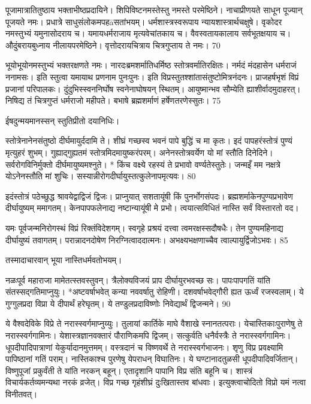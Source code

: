 पूजामात्रातितुष्ठाय भक्ताभीष्ठप्रदायिने।
शिपिविष्टनमस्तेस्तु नमस्ते परमेष्ठिने।
नाचाप्रीणयते साधून पूज्यान् पूजयते नमः।
प्रधात्रे साधुसंलोकमपहāसतांभयम्।
धर्मशास्त्रस्वरूपाय न्यायशास्त्रार्थचक्षुषे।
वृकोदर नमस्तुभ्यं यमुनासोदराय च।
यमायधर्मराजाय मृत्यवेचांतकाय च।
वैवस्वतायकालाय सर्वभूतक्षयाय च।
औदुंबरायबुध्नाय नीलायपरमेष्ठिने।
वृत्तोदरायचित्राय चित्रगुप्ताय ते नमः।
70

भूयोभूयोनमस्तुभ्यं भक्तरक्षणते नमः।
नारदःब्रमशर्मातिधर्मिष्ठ स्तोत्रवर्मातिरक्षितः।
नर्मदं मंदहासेन धर्मराजं ननामसः।
इति स्तुत्वा यमायाथ प्रणनाम पुनःपुनः।
इति विप्रस्तुतश्शांतासंतुष्टोमित्रनंदनः।
प्राजहर्षभृशं विप्रं प्रजानां परिपालकः।
दुंदुभिस्स्वननिर्घोष स्वनेनाघोषयन् स्थितम्।
आयुष्मान्भव सौम्येति ह्याशीर्वादमुदाहरत्।
निषिद्य तं चित्रगुप्तं धर्मराजो महीपते।
बभाषे ब्रह्मशर्माणं हर्षेणतरणेस्सुतः।
75

ईषदुन्मयमानस्सन् स्तुतिप्रीतो दयानिधिः।

स्तोत्रेनानेनसंतुष्ठो दीर्घमायुर्ददामि ते।
शीघ्रं गच्छस्व भवनं पापे बुद्धिं च मा कृतः।
इदं पापहरंस्तोत्रं पुण्यं मृत्युहरं शुभम्।
गुह्याद्गुह्यतमं स्तोत्रमिदमायुष्करंपरम्।
अनेनस्तोत्रवर्येण यो मां स्तौति दिनेदिने।
सर्वरोगविनिर्मुक्तो दीर्घमायुष्यमश्नुते।
* किंच वक्ष्ये रहस्यं ते प्रभावो वर्ण्यतेस्तुतेः।
जन्मइँ मम नक्षत्रे योऽनेनस्तौति मां शुचिः।
सस्यान्नीरोगदीर्घायुस्तत्कुलेनापमृत्यवः।
80

इदंस्तोत्रं पठेच्छुद्ध श्रावयेद्वाद्विजं द्विजः।
प्राप्नुयात् सशतायूंषी किं पुनर्भोगसंपदः।
ब्रह्मशर्माकेनपुण्यप्रभावेण दीर्घायुष्यम् ममागतम्।
केनपापफलेनाद्य नष्टान्यायूंषी मे प्रभो।
त्वयात्सविधितं नास्ति सर्वं विस्तारतो वद।

यमः
पूर्वजन्मनिरोगस्थं विप्रं रिक्तंविदेशगम्।
स्वगृहे प्रश्रयं दत्त्वा त्वमरक्षस्सदौषधैः।
तेन पुण्यमहिनाद्य दीर्घायुष्यं तवागतम्।
परान्नादनदोषेण निरग्नित्वाददात्मनः।
अभक्ष्यभक्षणाच्चैव त्वाल्पायुर्द्विजोऽभवः।
85

तस्मादाचारवान् भूया नास्तिधर्मवतोभयम्।

नळःपूर्व महाराजा मामेतत्स्तवस्तुवन्।
त्रैलोक्यविजयं प्राप दीर्घायुरभवच्छ सः।
पापःपापगतिं यांति संतस्सद्गतिमाप्नुयुः।
*अष्टवर्षाभवेत् कन्या नववर्षातु रोहिणी।
दशवर्षाभवेद्गौरी ह्यत ऊर्ध्वं रजस्वलाम्।
ये गुग्गुलप्रदा विप्रा ये दीपार्थं हरेघृतम्।
ये तण्डुलप्रदाविष्णोः निवेद्यार्थं द्विजन्मने।
90

ये वैश्वदेविके विप्रे ते नरास्स्वर्गमाप्नुय्युः।
तुलायां कार्तिके माघे वैशाखे स्नानतत्पराः।
येचास्तिकाःपुराणेषु ते नरास्स्वर्गगामिनः।
येशास्त्रज्ञानवक्तारं पौराणिकमपि द्विजम्।
सत्कुर्वति धनैर्वस्त्रैः ते नरास्स्वर्गगामिनः।
धूपदीपादिपात्राणां येकुर्यादानमुत्तमम्।
वस्त्रदानं च विष्णवर्थे ते नरास्स्वर्गभाजनः।
शृणु विप्र प्रवक्ष्यामि पापिष्ठानां गतिं पराम्।
नास्तिकाश्च पुरणेषु येपराधन् विघातिनः।
ये घण्टानादतुळसी धूपदीपादिवर्जितान्।
विष्णुपूजां प्रकुर्वंती ते यांति नरकन् बहून्।
एतादृशानि पापानि विप्र संति बहूनि च।
शास्त्रं विचार्यकर्तव्यमन्यथा नरकं व्रजेत्।
विप्र गच्छ गृहंशीघ्रं दुःखितास्तव बांधवाः।
इत्युक्त्वाचोदितो विप्रो यमं नत्वा विनीतवत्।

